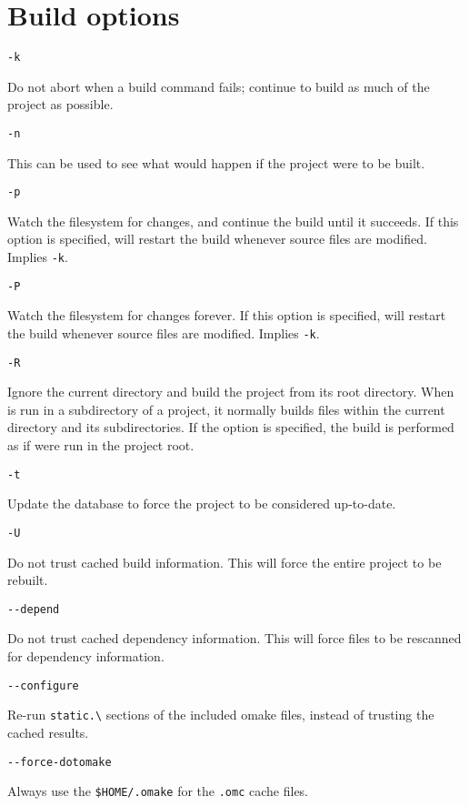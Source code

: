 \section{Build options}

 \verb+-k+

Do not abort when a build command fails;
continue to build as much of the project as possible.

 \verb+-n+

This can be used to see what would happen if the project were to be built.

 \verb+-p+

Watch the filesystem for changes, and continue the build until it succeeds.  If this
option is specified,  will restart the build whenever source files are modified. Implies
\texttt{-k}.

 \verb+-P+

Watch the filesystem for changes forever.  If this option is specified, 
will restart the build whenever source files are modified. Implies
\texttt{-k}.

 \verb+-R+

Ignore the current directory and build the project from its root directory.  When
 is run in a subdirectory of a project, it normally builds files within the current
directory and its subdirectories.  If the  option is specified, the build is performed as if
 were run in the project root.

 \verb+-t+

Update the  database to force the project to be considered up-to-date.

 \verb+-U+

Do not trust cached build information.  This will force the entire project to be rebuilt.

 \verb+--depend+

Do not trust cached dependency information.  This will force files to be rescanned
for dependency information.

 \verb+--configure+

Re-run \verb+static.\+ sections of the included omake files, instead of
trusting the cached results.

 \verb+--force-dotomake+

Always use the \verb+$HOME/.omake+ for the \verb+.omc+ cache files.

